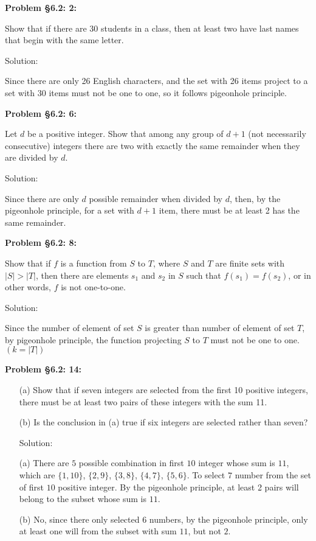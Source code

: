 \documentclass{article}
\newenvironment{problem}[1]
{\begin{mdframed}[default]
\textbf{Problem #1:}
}
{\end{mdframed}
}
\begin{document}
\begin{problem}{\S 6.2: 2}
Show that if there are 30 students in a class, then at least two have last names
that begin with the same letter.

Solution:

Since there are only 26 English characters, and the set with 26 items project to a set with 30 items must not be one to one, so it follows pigeonhole principle.
\end{problem}
\begin{problem}{\S 6.2: 6}
Let $d$ be a positive integer. Show that among any group of $d+1$ (not necessarily
consecutive) integers there are two with exactly the same remainder when they are
divided by $d$.

Solution:

Since there are only $d$ possible remainder when divided by $d$, then, by the pigeonhole principle, for a set with $d+1$ item, there must be at least 2 has the same remainder.
\end{problem}
\begin{problem}{\S 6.2: 8}
Show that if $f$ is a function from $S$ to $T$, where $S$ and $T$ are finite sets
with $|S| > |T|$, then there are elements $s_1$ and $s_2$ in $S$ such that $f(s_1)
= f(s_2)$, or in other words, $f$ is not one-to-one.

Solution:

Since the number of element of set $S$ is greater than number of element of set $T$, by pigeonhole principle, the function projecting $S$ to $T$ must not be one to one. $(k=|T|)$
\end{problem}
\begin{problem}{\S 6.2: 14}
\begin{enumerate}
\item[(a)] Show that if seven integers are selected from the first 10 positive
integers, there must be at least two pairs of these integers with the sum 11.
\item[(b)] Is the conclusion in (a) true if six integers are selected rather
than seven?

Solution:

(a) There are $5$ possible combination in first $10$ integer whose sum is $11$, which are $\{1,10\}$, $\{2,9\}$, $\{3,8\}$, $\{4,7\}$, $\{5,6\}$. To select $7$ number from the set of first $10$ positive integer. By the pigeonhole principle, at least 2 pairs will belong to the subset whose sum is $11$.

(b) No, since there only selected $6$ numbers, by the pigeonhole principle, only at least one will from the subset with sum $11$, but not $2$.

\end{enumerate}
\end{problem}
\end{document}
